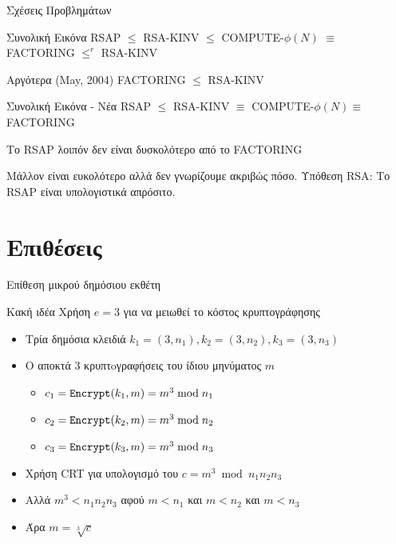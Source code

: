 \documentclass[handout]{beamer}
\begin{document}
\begin{frame}{Σχέσεις Προβλημάτων}
\begin{block}{Συνολική Εικόνα}
RSAP $\leq$ RSA-ΚINV $\leq$ COMPUTE-$\phi(N)$ $\equiv$ FACTORING $\leq^r$ RSA-KINV
\end{block}
\pause
Αργότερα (May, 2004)
FACTORING $\leq$ RSA-KINV
\pause
\begin{block}{Συνολική Εικόνα - Νέα}
RSAP $\leq$ RSA-ΚINV $\equiv$ COMPUTE-$\phi(N) \equiv$ FACTORING
\end{block}
\pause
Το RSAP λοιπόν δεν είναι δυσκολότερο από το FACTORING

Μάλλον είναι ευκολότερο αλλά δεν γνωρίζουμε ακριβώς πόσο.
\pause
\alert{Υπόθεση RSA}: Το RSAP είναι υπολογιστικά απρόσιτο.

\end{frame}

\section{Επιθέσεις}
\begin{frame}{Επίθεση μικρού δημόσιου εκθέτη}
\begin{block}{\alert{Κακή ιδέα}}
Χρήση $e=3$ για να μειωθεί το κόστος κρυπτογράφησης
\end{block}
\pause 
\begin{itemize}
\item Τρία δημόσια κλειδιά $k_1 = (3,n_1), k_2 = (3,n_2), k_3 = (3,n_3)$
\pause
\item O \adv αποκτά 3 κρυπτoγραφήσεις του ίδιου μηνύματος $m$
\begin{itemize}
\item $c_1 = \mathtt{Encrypt}(k_1,m) = m^3 \bmod{n_1}$
\item $c_2 = \mathtt{Encrypt}(k_2,m) = m^3 \bmod{n_2}$
\item $c_3 = \mathtt{Encrypt}(k_3,m) = m^3 \bmod{n_3}$
\end{itemize}
\pause
\item Χρήση CRT για υπολογισμό του $c = m^3 \bmod {n_1n_2n_3}$
\item Αλλά $m^3 < n_1n_2n_3$ αφού $m < n_1$ και $m < n_2$ και $ m<n_3$
\item Άρα $m = \sqrt[3]{c}$
\end{itemize}
\end{frame}
\end{document}
